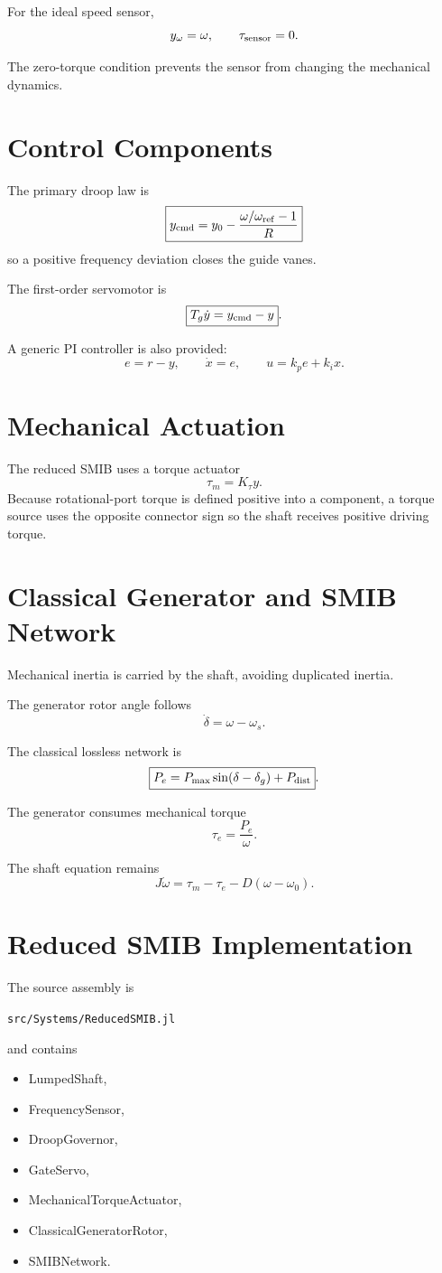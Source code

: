 \documentclass[10pt,a4paper]{article}
\begin{document}
For the ideal speed sensor,
\[
y_\omega=\omega,
\qquad
\tau_{\rm sensor}=0.
\]

The zero-torque condition prevents the sensor from changing the mechanical dynamics.

\section{Control Components}
The primary droop law is
\[
\boxed{
y_{\rm cmd}
=
y_0-
\frac{\omega/\omega_{\rm ref}-1}{R}
}
\]
so a positive frequency deviation closes the guide vanes.

The first-order servomotor is
\[
\boxed{
T_g\dot y=y_{\rm cmd}-y
}.
\]

A generic PI controller is also provided:
\[
e=r-y,
\qquad
\dot x=e,
\qquad
u=k_p e+k_i x.
\]

\section{Mechanical Actuation}
The reduced SMIB uses a torque actuator
\[
\tau_m=K_\tau y.
\]
Because rotational-port torque is defined positive into a component, a torque source uses the opposite connector sign so the shaft receives positive driving torque.

\section{Classical Generator and SMIB Network}
Mechanical inertia is carried by the shaft, avoiding duplicated inertia.

The generator rotor angle follows
\[
\boxed{
\dot\delta=\omega-\omega_s
}.
\]

The classical lossless network is
\[
\boxed{
P_e=P_{\max}\sin(\delta-\delta_g)+P_{\rm dist}
}.
\]

The generator consumes mechanical torque
\[
\tau_e=\frac{P_e}{\omega}.
\]

The shaft equation remains
\[
J\dot\omega=\tau_m-\tau_e-D(\omega-\omega_0).
\]

\section{Reduced SMIB Implementation}
The source assembly is
\begin{center}
\texttt{src/Systems/ReducedSMIB.jl}
\end{center}
and contains
\begin{itemize}
\item LumpedShaft,
\item FrequencySensor,
\item DroopGovernor,
\item GateServo,
\item MechanicalTorqueActuator,
\item ClassicalGeneratorRotor,
\item SMIBNetwork.
\end{itemize}
\end{document}
